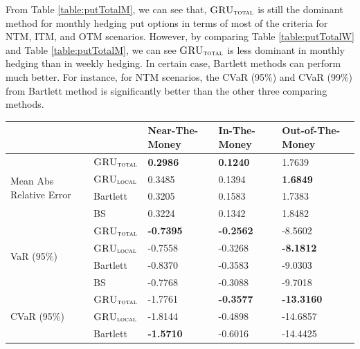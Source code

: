\documentclass[letterpaper,12pt,titlepage,oneside,final]{book}
\numberwithin{equation}{section}
\theoremstyle{definition}
\newcommand{\modelT}{\textsc{GRU}_{\textsc{total}}}
\newcommand{\modelL}{\textsc{GRU}_{\textsc{local}}}
\begin{document}
From Table \ref{table:putTotalM}, we can see that, $\modelT$ is still the dominant  method for monthly hedging put options in terms of most of the criteria for NTM, ITM, and OTM scenarios.  However, by comparing Table \ref{table:putTotalW} and Table \ref{table:putTotalM}, we can see $\modelT$ is less dominant in monthly hedging than in weekly hedging. In certain case, Bartlett methods can perform much better. For instance, for NTM scenarios, the CVaR (95\%) and CVaR (99\%) from Bartlett method is significantly better than the other three comparing methods.
\begin{table}[htp!]
	\centering
	\begin{tabular}{ll|l|l|l|}
		\cline{3-5}
		&          & Near-The-Money   & In-The-Money     & Out-of-The-Money  \\ \hline
		\multicolumn{1}{|l|}{\multirow{4}{*}{Mean Abs Relative Error}} & $\modelT$    & \textbf{0.2986}  & \textbf{0.1240}  & 1.7639            \\  
		\multicolumn{1}{|l|}{}                                & $\modelL$    & 0.3485           & 0.1394           & \textbf{1.6849}   \\  
		\multicolumn{1}{|l|}{}                                & Bartlett & 0.3205           & 0.1583           & 1.7383            \\  
		\multicolumn{1}{|l|}{}                                & BS       & 0.3224           & 0.1342           & 1.8482            \\ \hline
		\multicolumn{1}{|l|}{\multirow{4}{*}{VaR (95\%)}}     & $\modelT$    & \textbf{-0.7395} & \textbf{-0.2562} & -8.5602           \\  
		\multicolumn{1}{|l|}{}                                & $\modelL$    & -0.7558          & -0.3268          & \textbf{-8.1812}  \\  
		\multicolumn{1}{|l|}{}                                & Bartlett & -0.8370          & -0.3583          & -9.0303           \\  
		\multicolumn{1}{|l|}{}                                & BS       & -0.7768          & -0.3088          & -9.7018           \\ \hline
		\multicolumn{1}{|l|}{\multirow{4}{*}{CVaR (95\%)}}    & $\modelT$    & -1.7761          & \textbf{-0.3577} & \textbf{-13.3160} \\  
		\multicolumn{1}{|l|}{}                                & $\modelL$    & -1.8144          & -0.4898          & -14.6857          \\  
		\multicolumn{1}{|l|}{}                                & Bartlett & \textbf{-1.5710} & -0.6016          & -14.4425          \\  

\end{tabular}
\end{table}
\end{document}
